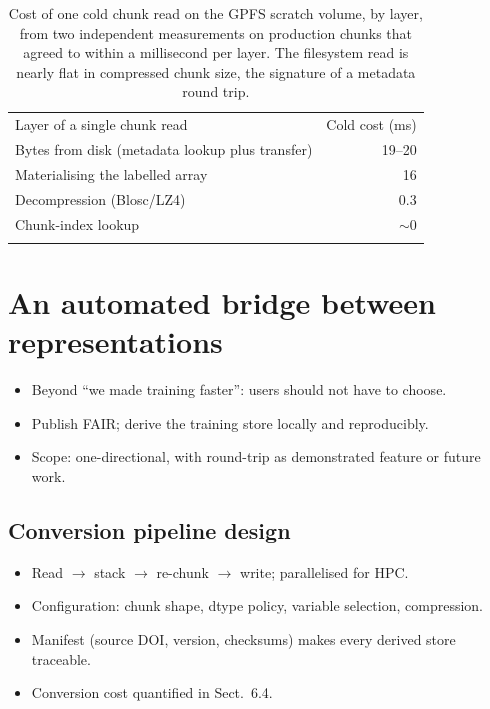 \documentclass[gmd, manuscript]{copernicus}
\begin{document}
\begin{table}[t]
\caption{Cost of one cold chunk read on the GPFS scratch volume, by layer, from two independent
measurements on production chunks that agreed to within a millisecond per layer. The filesystem
read is nearly flat in compressed chunk size, the signature of a metadata round trip.}
\label{tab:per-chunk}
\begin{tabular}{lr}
\tophline
Layer of a single chunk read & Cold cost (ms) \\
\middlehline
Bytes from disk (metadata lookup plus transfer) & 19--20 \\
Materialising the labelled array                & 16 \\
Decompression (Blosc/LZ4)                       & 0.3 \\
Chunk-index lookup                              & ${\sim}0$ \\
\bottomhline
\end{tabular}
\end{table}

\section{An automated bridge between representations}
\label{sec:bridge}
\begin{itemize}
\item Beyond ``we made training faster'': users should not have to choose.
\item Publish FAIR; derive the training store locally and reproducibly.
\item Scope: one-directional, with round-trip as demonstrated feature or future work.
\end{itemize}
\subsection{Conversion pipeline design}
\begin{itemize}
\item Read $\rightarrow$ stack $\rightarrow$ re-chunk $\rightarrow$ write; parallelised for HPC.
\item Configuration: chunk shape, dtype policy, variable selection, compression.
\item Manifest (source DOI, version, checksums) makes every derived store traceable.
\item Conversion cost quantified in Sect.~6.4.
\end{itemize}
\end{document}
